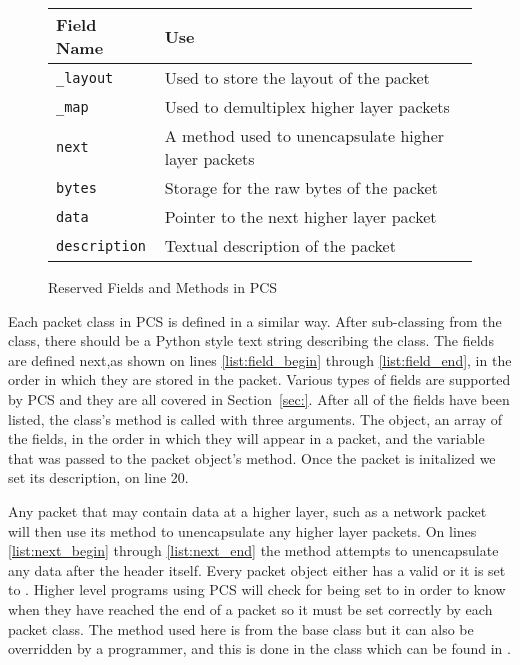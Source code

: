 \documentclass[11pt]{article}
\begin{document}
\begin{figure}
  \centering
\begin{tabular}{|l|l|}
\hline
Field Name & Use \\
\hline
\texttt{\_layout} & Used to store the layout of the packet\\
\hline
\texttt{\_map} & Used to demultiplex higher layer packets\\
\hline
\texttt{next} & A method used to unencapsulate higher layer packets\\
\hline
\texttt{bytes} & Storage for the raw bytes of the packet\\
\hline
\texttt{data} & Pointer to the next higher layer packet\\
\hline
\texttt{description} & Textual description of the packet\\
\hline
\end{tabular}
  \caption{Reserved Fields and Methods in PCS}
  \label{fig:reserved_fields_and_methods}
\end{figure}

Each packet class in PCS is defined in a similar way.  After
sub-classing from the  class, there should be a Python
style text string describing the class.  The fields are defined
next,as shown on lines \ref{list:field_begin} through
\ref{list:field_end}, in the order in which they are stored in the
packet.  Various types of fields are supported by PCS and they are all
covered in Section~\ref{sec:}.  After all of the fields have been
listed, the  class's  method is called with
three arguments.  The  object, an array of the fields, in
the order in which they will appear in a packet, and the 
variable that was passed to the packet object's  method.
Once the packet is initalized we set its description, on line 20.

Any packet that may contain data at a higher layer, such as a network
packet will then use its  method to unencapsulate any
higher layer packets.  On lines \ref{list:next_begin} through
\ref{list:next_end} the  method attempts to unencapsulate
any data after the header itself.  Every packet object either has a
valid  or it is set to .  Higher level
programs using PCS will check for  being set to
 in order to know when they have reached the end of a
packet so it must be set correctly by each packet class.  The
 method used here is from the  base class
but it can also be overridden by a programmer, and this is done in the
 class which can be found in .
\end{document}
